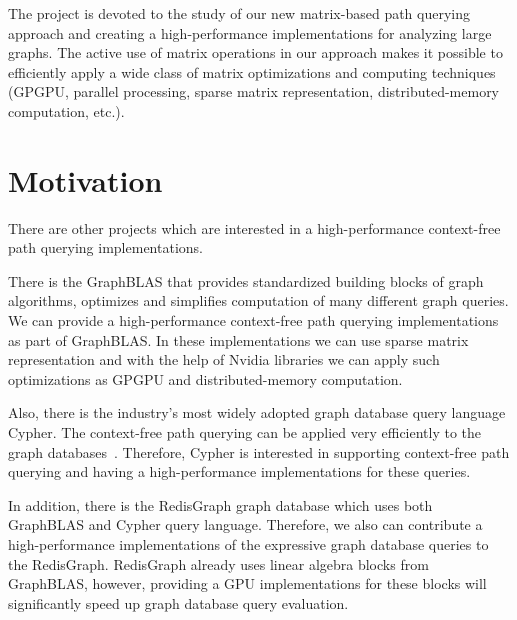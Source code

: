 \documentclass[12pt]{article}  %
\theoremstyle{remark}
\begin{document}
The project is devoted to the study of our new matrix-based path querying approach and creating a high-performance implementations for analyzing large graphs. The active use of matrix operations in our approach makes it possible to efficiently apply a wide class of matrix optimizations and computing techniques (GPGPU, parallel processing, sparse matrix representation, distributed-memory computation, etc.).

\section{Motivation}
There are other projects which are interested in a high-performance context-free path querying implementations.

There is the GraphBLAS that provides standardized building blocks of graph algorithms, optimizes and simplifies computation of many different graph queries. We can provide a high-performance context-free path querying implementations as part of GraphBLAS. In these implementations we can use sparse matrix representation and with the help of Nvidia libraries we can apply such optimizations as GPGPU and distributed-memory computation.

Also, there is the industry’s most widely adopted graph database query language Cypher. The context-free path querying can be applied very efficiently to the graph databases~\cite{kuijpers2019experimental}. Therefore, Cypher is interested in supporting context-free path querying and having a high-performance implementations for these queries.

In addition, there is the RedisGraph graph database which uses both GraphBLAS and Cypher query language. Therefore, we also can contribute a high-performance implementations of the expressive graph database queries to the RedisGraph. RedisGraph already uses linear algebra blocks from GraphBLAS, however, providing a GPU implementations for these blocks will significantly speed up graph database query evaluation.


\end{document}
